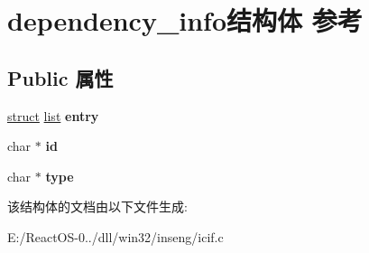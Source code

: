 \hypertarget{structdependency__info}{}\section{dependency\+\_\+info结构体 参考}
\label{structdependency__info}
\subsection*{Public 属性}
\begin{DoxyCompactItemize}
\item 
\mbox{\label{structdependency__info_a498f8ff5e05a4d1a463267f1bee0bcf6}} 
\hyperlink{interfacestruct}{struct} \hyperlink{classlist}{list} {\bfseries entry}
\item 
\mbox{\label{structdependency__info_a40f044231fb4a62d4bd46df0f2d47f20}} 
char $\ast$ {\bfseries id}
\item 
\mbox{\label{structdependency__info_a0d8d26dd7a9ee2767cad4ca35ef50e59}} 
char $\ast$ {\bfseries type}
\end{DoxyCompactItemize}


该结构体的文档由以下文件生成\+:\begin{DoxyCompactItemize}
\item 
E\+:/\+React\+O\+S-\/0../dll/win32/inseng/icif.\+c\end{DoxyCompactItemize}
